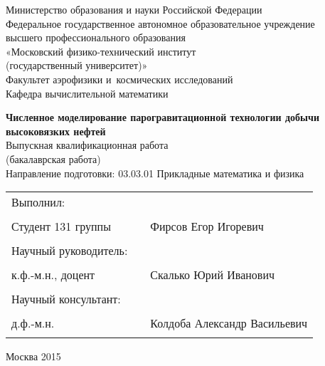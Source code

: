 \documentclass[12pt,a4paper]{article}
\begin{document}
{
	
\thispagestyle{empty}
\begin{center}
Министерство образования и науки Российской Федерации
\\
Федеральное государственное автономное образовательное учреждение\\[-6pt] высшего профессионального образования\\[-6pt]
«Московский физико-технический институт\\[-6pt]
(государственный университет)»
\\
Факультет аэрофизики и~космических исследований\\[-6pt]
Кафедра вычислительной математики\\
\end{center}

\vspace{20mm}

\begin{center}
{\large {\bf Численное моделирование парогравитационной технологии добычи высоковязких нефтей\\[8mm] }} 
Выпускная квалификационная работа \\
(бакалаврская работа)\\
Направление подготовки: 03.03.01 Прикладные математика и физика
\end{center}

\vspace{20mm}

\begin{flushleft}
\begin{tabularx}{\textwidth}{lcl}
Выполнил: \\
Студент 131 группы  & \rule{5cm}{1pt} & Фирсов Егор Игоревич \\[5mm]

Научный руководитель:\\
к.ф.-м.н., доцент & \rule{5cm}{1pt} & Скалько Юрий Иванович \\[5mm]
Научный консультант:\\
д.ф.-м.н.              & \rule{5cm}{1pt} & Колдоба Александр Васильевич \\
\end{tabularx}
\end{flushleft}

\vfill

\begin{center}
 Москва 2015
\end{center}
}
\end{document}
